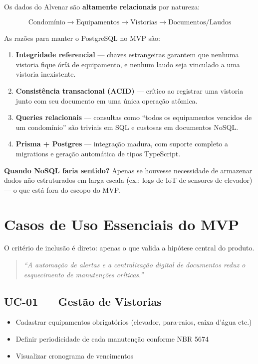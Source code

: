 \documentclass[12pt, a4paper]{article}
\begin{document}
Os dados do Alvenar são \textbf{altamente relacionais} por natureza:

\[
\text{Condomínio} \rightarrow \text{Equipamentos} \rightarrow \text{Vistorias} \rightarrow \text{Documentos/Laudos}
\]

As razões para manter o PostgreSQL no MVP são:

\begin{enumerate}[leftmargin=1.5em]
    \item \textbf{Integridade referencial} — chaves estrangeiras garantem que nenhuma vistoria
    fique órfã de equipamento, e nenhum laudo seja vinculado a uma vistoria inexistente.
    \item \textbf{Consistência transacional (ACID)} — crítico ao registrar uma vistoria junto
    com seu documento em uma única operação atômica.
    \item \textbf{Queries relacionais} — consultas como ``todos os equipamentos vencidos de um
    condomínio'' são triviais em SQL e custosas em documentos NoSQL.
    \item \textbf{Prisma + Postgres} — integração madura, com suporte completo a migrations e
    geração automática de tipos TypeScript.
\end{enumerate}

\textbf{Quando NoSQL faria sentido?} Apenas se houvesse necessidade de armazenar dados
não estruturados em larga escala (ex.: logs de IoT de sensores de elevador) — o que está
fora do escopo do MVP.

\vspace{0.5cm}

\section{Casos de Uso Essenciais do MVP}

O critério de inclusão é direto: apenas o que valida a hipótese central do produto.

\begin{quote}
\textit{``A automação de alertas e a centralização digital de documentos reduz
o esquecimento de manutenções críticas.''}
\end{quote}

\subsection{UC-01 — Gestão de Vistorias}

\begin{itemize}[leftmargin=1.5em]
    \item Cadastrar equipamentos obrigatórios (elevador, para-raios, caixa d'água etc.)
    \item Definir periodicidade de cada manutenção conforme NBR 5674
    \item Visualizar cronograma de vencimentos
\end{itemize}
\end{document}
